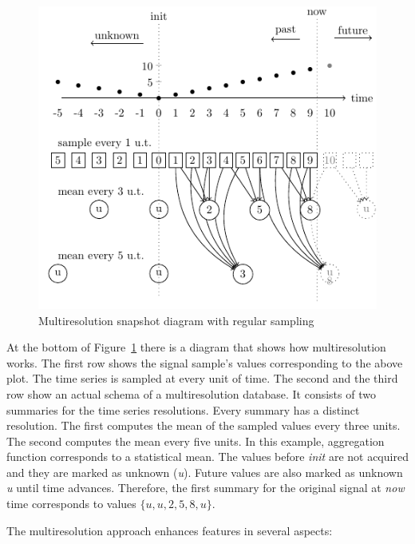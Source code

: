 \begin{figure}
  \centering
  \includegraphics{fig_mtsms_sequence.pdf}
  \caption{Multiresolution snapshot diagram with regular sampling}
  \label{fig:mtsms:sequence}
\end{figure}

At the bottom of Figure~\ref{fig:mtsms:sequence} there is a diagram
that shows how multiresolution works.
%
The first row shows the signal sample's values corresponding to the
above plot. The time series is sampled at every unit of time. 
%
The second and the third row show an actual schema of a
multiresolution database. It consists of two summaries for the time
series resolutions. Every summary has a distinct resolution.
%
The first computes the mean of the sampled values every three units.
The second computes the mean every five units.
%
In this example, aggregation function corresponds to a statistical
mean. The values before \emph{init} are not acquired and they are
marked as unknown (\emph{u}). Future values are also marked as unknown
\emph{u} until time advances. Therefore, the first summary for the
original signal at \emph{now} time corresponds to values
$\{u,u,2,5,8,u\}$.


The multiresolution approach enhances  features in several
aspects:

